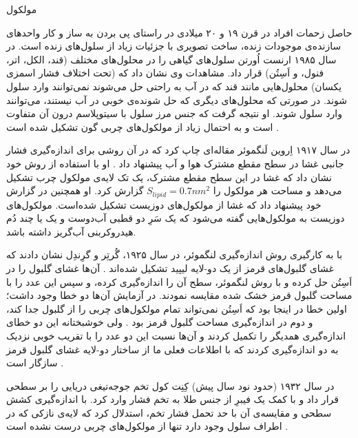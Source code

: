 مولکول%

حاصل زحمات افراد در قرن ۱۹ و ۲۰ میلادی در راستای پی بردن به ساز و کار واحد‌های سازنده‌ی موجودات زنده، ساخت تصویری با جزئیات زیاد از سلول‌های زنده است. در سال ۱۹۸۵ ارنست اُورتن  
سلول‌های گیاهی را در محلول‌های مختلف (قند،‌ الکل، اتر، فنول، و اَسِتُن) قرار داد. مشاهدات وی نشان داد که (تحت اختلاف فشار اسمزی یکسان) محلول‌هایی مانند قند که در آب به راحتی حل می‌شوند نمی‌توانند وارد سلول شوند. در صورتی که محلول‌های دیگری که حل شونده‌ی خوبی در آب نیستند، می‌توانند وارد سلول شوند. او نتیجه گرفت که جنس مرز سلول با سیتوپلاسم درون آن متفاوت است و به احتمال زیاد از مولکول‌های چربی گون تشکیل شده است
\cite{overton1985}.

در سال ۱۹۱۷ اِروین لَنگموئر 
 مقاله‌ای چاپ کرد که در آن روشی برای اندازه‌گیری فشار جانبی
 غشا در سطح مقطع مشترک هوا و آب پیشنهاد داد
 \cite{Langmuir1917}.
 او با استفاده از روش خود نشان داد که غشا در این سطح مقطع مشترک، یک تک لایه‌ی مولکول چرب تشکیل می‌دهد و مساحت هر مولکول را 
 $S_{lipid} = 0.7 nm^2$
 گزارش کرد. او همچنین در گزارش خود پیشنهاد داد که غشا از مولکول‌های دوزیست
 تشکیل شده‌است. مولکول‌های دوزیست به مولکول‌هایی گفته می‌شود که یک سَرِ دو قطبی آب‌دوست
  و یک یا چند دُم هیدروکربنی آب‌گریز
   داشته باشد. 
 
با به کارگیری روش اندازه‌گیری لنگموئر، در سال ۱۹۲۵، گُرتِر
 و گرِندِل
 نشان دادند که  غشای گلبول‌های قرمز از یک دو-لایه لیپید تشکیل شده‌اند
 \cite{Gorter1925}.
 آن‌ها غشای گلبول را در اَسِتُن حل کرده و با روش لنگموئر، سطح آن را اندازه‌گیری کرده، و سپس این عدد را با مساحت گلبول قرمز خشک شده مقایسه نمودند. در آزمایش آن‌ها دو خطا وجود داشت؛ اولین خطا در اینجا بود که اَسِتُن نمی‌تواند تمام مولکول‌های چربی را از گلبول جدا کند، و دوم در اندازه‌گیری مساحت گلبول قرمز بود
 \cite{BiomembranesBook1989,BioMemBook2007}.
 ولی خوشبختانه این دو خطای اندازه‌گیری همدیگر را تکمیل کردند و آن‌ها نسبت این دو عدد را با تقریب خوبی نزدیک به دو اندازه‌گیری کردند که با اطلاعات فعلی ما از ساختار  دو-لایه غشای گلبول قرمز سازگار است
 \cite{Edidin2003}.
 
  
 
 
 در سال ۱۹۳۲ (حدود نود سال پیش) کِنِت کول
 تخم جوجه‌تیغی دریایی 
را بر سطحی قرار داد و  با کمک یک فیبرِ از جنس طلا به تخم  فشار وارد کرد. با اندازه‌گیری  کشش سطحی و مقایسه‌ی آن با حد تحمل فشار تخم، استدلال کرد که لایه‌ی نازکی که در اطراف سلول وجود دارد تنها از مولکول‌های چربی درست نشده است
 \cite{Cole1932}. 

